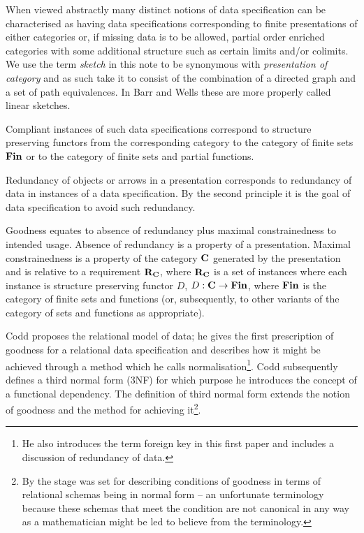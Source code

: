 \documentclass[10pt,a4paper]{article}
\theoremstyle{remark}
\begin{document}
\note
When viewed abstractly many distinct notions of data specification can be characterised as having
data specifications corresponding to finite presentations of either categories or, if missing data is to be allowed, partial order enriched categories with some additional structure such as certain limits and/or colimits. We use the term \textit{sketch}
in this note to be synonymous with \textit{presentation of category} and as such take it to consist of the combination of a directed graph and a set of path equivalences. In Barr and Wells \cite{BarrandWells} these are more properly called linear sketches.  

\note
Compliant instances of such data specifications correspond to structure preserving functors from the corresponding category to the category of finite sets $\textbf{Fin}$ or to the category of finite sets and partial functions.

\note
Redundancy of objects or arrows in a presentation corresponds to redundancy of data in instances of a data specification. 
By the second principle it is the goal of data specification to avoid such redundancy. 

\note
Goodness equates to absence of redundancy plus maximal constrainedness to intended usage. Absence of redundancy is a property of a presentation. Maximal constrainedness
is a property of the category $\textbf{C}$ generated by the presentation and is relative to a requirement $\textbf{R}_{\textbf{C}}$, where $\textbf{R}_{\textbf{C}}$ is a set of instances where each instance is structure preserving functor $D$, $D: \textbf{C} \rightarrow \textbf{Fin}$, where
$\textbf{Fin}$ is the category of finite sets and functions (or, subsequently, to other variants of the category of sets and functions as appropriate).

\note 
Codd \cite{Codd1970} proposes the relational model of data; he gives the first prescription of goodness for
a relational data specification and describes how it might be achieved through a method which he calls normalisation\cite{Codd1970}\footnote{He also introduces the term foreign key in this first paper and includes a discussion of redundancy of data.}. 
Codd  subsequently defines a third normal form (3NF) \cite{Codd1971} for which purpose he introduces 
the concept of a functional dependency.
The definition of third normal form extends the notion of goodness and the method for achieving it\footnote{By \cite{Codd1971} the stage was set 
for describing conditions of goodness in terms of relational schemas being in normal form -- an  unfortunate terminology  because these schemas that meet the condition
are not canonical in any way as a mathematician might be led to believe from the terminology.}.
\end{document}
